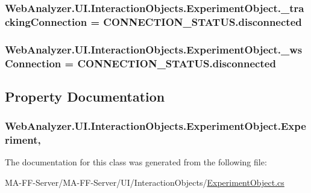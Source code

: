 \subsubsection[{\+\_\+tracking\+Connection}]{ Web\+Analyzer.\+U\+I.\+Interaction\+Objects.\+Experiment\+Object.\+\_\+tracking\+Connection = {\bf C\+O\+N\+N\+E\+C\+T\+I\+O\+N\+\_\+\+S\+T\+A\+T\+U\+S.\+disconnected}\hspace{0.3cm}{\ttfamily [private]}}\label{class_web_analyzer_1_1_u_i_1_1_interaction_objects_1_1_experiment_object_a7cb71354914a07dab1f19146216aa777}
\hypertarget{class_web_analyzer_1_1_u_i_1_1_interaction_objects_1_1_experiment_object_a37bc6281799039ec5d51c400ddb07ca0}{}
\subsubsection[{\+\_\+ws\+Connection}]{ Web\+Analyzer.\+U\+I.\+Interaction\+Objects.\+Experiment\+Object.\+\_\+ws\+Connection = {\bf C\+O\+N\+N\+E\+C\+T\+I\+O\+N\+\_\+\+S\+T\+A\+T\+U\+S.\+disconnected}\hspace{0.3cm}{\ttfamily [private]}}\label{class_web_analyzer_1_1_u_i_1_1_interaction_objects_1_1_experiment_object_a37bc6281799039ec5d51c400ddb07ca0}


\subsection{Property Documentation}
\hypertarget{class_web_analyzer_1_1_u_i_1_1_interaction_objects_1_1_experiment_object_a2b87e06b55663703f1017c95c19bfa29}{}
\subsubsection[{Experiment}]{ Web\+Analyzer.\+U\+I.\+Interaction\+Objects.\+Experiment\+Object.\+Experiment\hspace{0.3cm}{\ttfamily [get]}, {\ttfamily [set]}}\label{class_web_analyzer_1_1_u_i_1_1_interaction_objects_1_1_experiment_object_a2b87e06b55663703f1017c95c19bfa29}


The documentation for this class was generated from the following file\+:\begin{DoxyCompactItemize}
\item 
M\+A-\/\+F\+F-\/\+Server/\+M\+A-\/\+F\+F-\/\+Server/\+U\+I/\+Interaction\+Objects/\hyperlink{_experiment_object_8cs}{Experiment\+Object.\+cs}\end{DoxyCompactItemize}
